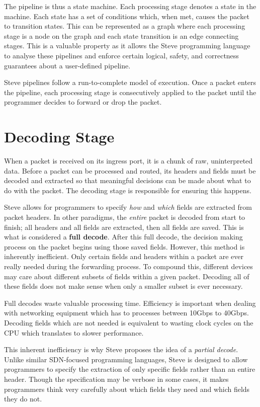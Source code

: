 The pipeline is thus a state machine. Each processing stage denotes a state in the machine. Each state has a set of conditions which, when met, causes the packet to transition states. This can be represented as a graph where each processing stage is a node on the graph and each state transition is an edge connecting stages. This is a valuable property as it allows the Steve programming language to analyse these pipelines and enforce certain logical, safety, and correctness guarantees about a user-defined pipeline.

Steve pipelines follow a run-to-complete model of execution. Once a packet enters the pipeline, each processing stage is consecutively applied to the packet until the programmer decides to forward or drop the packet.

\section{Decoding Stage} \label{decoder_desc}

When a packet is received on its ingress port, it is a chunk of raw, uninterpreted data. Before a packet can be processed and routed, its headers and fields must be decoded and extracted so that meaningful decisions can be made about what to do with the packet. The decoding stage is responsible for ensuring this happens.

Steve allows for programmers to specify \textit{how} and \textit{which} fields are extracted from packet headers. In other paradigms, the \textit{entire} packet is decoded from start to finish; all headers and all fields are extracted, then all fields are saved. This is what is considered a \textbf{full decode}. After this full decode, the decision making process on the packet begins using those saved fields. However, this method is inherently inefficient. Only certain fields and headers within a packet are ever really needed during the forwarding process. To compound this, different devices may care about different subsets of fields within a given packet. Decoding all of these fields does not make sense when only a smaller subset is ever necessary.

Full decodes waste valuable processing time. Efficiency is important when dealing with networking equipment which has to processes between 10Gbps to 40Gbps. Decoding fields which are not needed is equivalent to wasting clock cycles on the CPU which translates to slower performance.

This inherent inefficiency is why Steve proposes the idea of a \textit{partial decode}. Unlike similar SDN-focused programming languages, Steve is designed to allow programmers to specify the extraction of only specific fields rather than an entire header. Though the specification may be verbose in some cases, it makes programmers think very carefully about which fields they need and which fields they do not.

